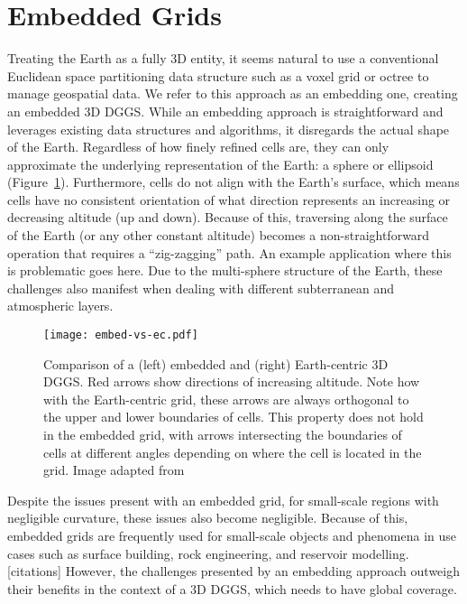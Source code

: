\section{Embedded Grids} \label{chap:3:embedded}
Treating the Earth as a fully 3D entity, it seems natural to use a conventional Euclidean space partitioning data structure such as a voxel grid or octree to manage geospatial data.
We refer to this approach as an embedding one, creating an embedded 3D DGGS.
While an embedding approach is straightforward and leverages existing data structures and algorithms, it disregards the actual shape of the Earth.
Regardless of how finely refined cells are, they can only approximate the underlying representation of the Earth: a sphere or ellipsoid (Figure~\ref{fig:embedded}).
Furthermore, cells do not align with the Earth's surface, which means cells have no consistent orientation of what direction represents an increasing or decreasing altitude (up and down).
Because of this, traversing along the surface of the Earth (or any other constant altitude) becomes a non-straightforward operation that requires a ``zig-zagging'' path.
An example application where this is problematic goes here.
Due to the multi-sphere structure of the Earth, these challenges also manifest when dealing with different subterranean and atmospheric layers.


\begin{figure}[ht!]
	\centering
	\texttt{[image: embed-vs-ec.pdf]}
	\caption[Comparison of embedded and Earth-centric approaches for a 3D DGGS]{
		Comparison of a (left) embedded and (right) Earth-centric 3D DGGS.
		Red arrows show directions of increasing altitude.
		Note how with the Earth-centric grid, these arrows are always orthogonal to the upper and lower boundaries of cells.
		This property does not hold in the embedded grid, with arrows intersecting the boundaries of cells at different angles depending on where the cell is located in the grid.
		Image adapted from~\cite{yu2012large-scale}
	}
	\label{fig:embedded}
\end{figure}


Despite the issues present with an embedded grid, for small-scale regions with negligible curvature, these issues also become negligible.
Because of this, embedded grids are frequently used for small-scale objects and phenomena in use cases such as surface building, rock engineering, and reservoir modelling. [citations]
However, the challenges presented by an embedding approach outweigh their benefits in the context of a 3D DGGS, which needs to have global coverage.


